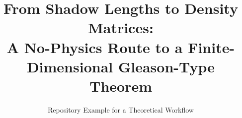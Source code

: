 \documentclass[11pt]{article}
\title{From Shadow Lengths to Density Matrices:\\A No-Physics Route to a Finite-Dimensional Gleason-Type Theorem}
\author{Repository Example for a Theoretical Workflow}
\date{}
\begin{document}
\maketitle

\begin{abstract}

\end{abstract}








\appendix




\end{document}
